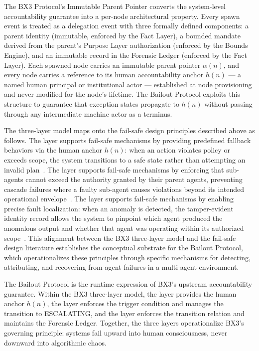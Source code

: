 The BX3 Protocol's Immutable Parent Pointer converts the system-level accountability guarantee into a per-node architectural property. Every spawn event is treated as a delegation event with three formally defined components: a parent identity (immutable, enforced by the Fact Layer), a bounded mandate derived from the parent's Purpose Layer authorization (enforced by the Bounds Engine), and an immutable record in the Forensic Ledger (enforced by the Fact Layer). Each spawned node carries an immutable parent pointer $\alpha(n)$, and every node carries a reference to its human accountability anchor $h(n)$ --- a named human principal or institutional actor --- established at node provisioning and never modified for the node's lifetime. The Bailout Protocol exploits this structure to guarantee that exception states propagate to $h(n)$ without passing through any intermediate machine actor as a terminus.

The three-layer model maps onto the fail-safe design principles described above as follows. The \purpose{} layer supports fail-safe mechanisms by providing predefined fallback behaviors via the human anchor $h(n)$: when an action violates policy or exceeds scope, the system transitions to a safe state rather than attempting an invalid plan~\cite{wiener1948}. The \bounds{} layer supports fail-safe mechanisms by enforcing that sub-agents cannot exceed the authority granted by their parent agents, preventing cascade failures where a faulty sub-agent causes violations beyond its intended operational envelope~\cite{dijkstra1982}. The \fact{} layer supports fail-safe mechanisms by enabling precise fault localization: when an anomaly is detected, the tamper-evident identity record allows the system to pinpoint which agent produced the anomalous output and whether that agent was operating within its authorized scope~\cite{tristr81}. This alignment between the BX3 three-layer model and the fail-safe design literature establishes the conceptual substrate for the Bailout Protocol, which operationalizes these principles through specific mechanisms for detecting, attributing, and recovering from agent failures in a multi-agent environment.

The Bailout Protocol is the runtime expression of BX3's upstream accountability guarantee. Within the BX3 three-layer model, the \purpose{} layer provides the human anchor $h(n)$, the \bounds{} layer enforces the trigger condition and manages the transition to ESCALATING, and the \fact{} layer enforces the transition relation and maintains the Forensic Ledger. Together, the three layers operationalize BX3's governing principle: systems fail upward into human consciousness, never downward into algorithmic chaos.
